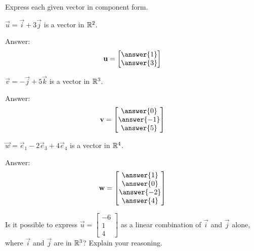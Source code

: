 \documentclass{ximera}
\begin{document}
\begin{problem}%
Express each given vector in component form.
  \begin{problem}\label{prob:lincombijk2a}
  $\vec{u}=\vec{i}+3\vec{j}$ is a vector in $\mathbb{R}^2$.
  
  Answer:
  $$\vec{u}=\begin{bmatrix}\answer{1}\\\answer{3}\end{bmatrix}$$
  \end{problem}
  \begin{problem}\label{prob:lincombijk2b}
  $\vec{v}=-\vec{j}+5\vec{k}$ is a vector in $\mathbb{R}^3$.
  
  Answer:
  $$\vec{v}=\begin{bmatrix}\answer{0}\\\answer{-1}\\\answer{5}\end{bmatrix}$$
  \end{problem}
  \begin{problem}\label{prob:lincombijk2c}
  $\vec{w}=\vec{e}_1-2\vec{e}_3+4\vec{e}_4$ is a vector in $\mathbb{R}^4$.
  
  Answer:
  $$\vec{w}=\begin{bmatrix}\answer{1}\\\answer{0}\\\answer{-2}\\\answer{4}\end{bmatrix}$$
  \end{problem}
  \end{problem}
  
  \begin{problem}\label{prob:lincombijk3}
  Is it possible to express $\vec{u}=\begin{bmatrix}
-6\\
1\\
4
\end{bmatrix}$ as a linear combination of $\vec{i}$ and $\vec{j}$ alone, where $\vec{i}$ and $\vec{j}$ are in $\mathbb{R}^3$?  Explain your reasoning.
\end{problem}
\end{document}
